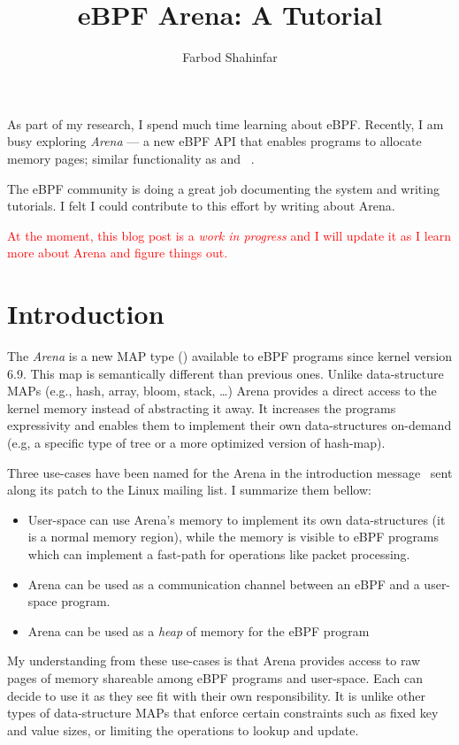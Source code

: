 \documentclass{article}
\title{eBPF Arena: A Tutorial}
\author{Farbod Shahinfar}
\begin{document}
\maketitle



As part of my research, I spend much time learning about eBPF.
Recently, I am busy exploring \emph{Arena} --- a new eBPF API that enables
programs to allocate memory pages; similar functionality as  and
~\cite{arenapatch}.

The eBPF community is doing a great job documenting the system and writing
tutorials. I felt I could contribute to this effort by writing about Arena.

{
    \textcolor{red}{At the moment, this blog post is a \emph{work in
    progress} and I will update it as I learn more about Arena and figure
    things out.}
}

\section{Introduction}

The \emph{Arena} is a new MAP type () available to eBPF programs
since kernel version 6.9.
This map is semantically different than previous ones.
Unlike data-structure MAPs (e.g., hash, array, bloom, stack, \dots{}) Arena
provides a direct access to the kernel memory instead of abstracting it away.
It increases the programs expressivity and enables them to implement their own
data-structures on-demand (e.g, a specific type of tree or a more optimized
version of hash-map).

Three use-cases have been named for the Arena in the introduction
message~\cite{arenapatch} sent along its patch to the Linux mailing list. I
summarize them bellow:
\begin{itemize}
    \item User-space can use Arena's memory to implement its own
        data-structures (it is a normal memory region), while the memory is
        visible to eBPF programs which can implement a fast-path for operations
        like packet processing.
    \item Arena can be used as a communication channel between an eBPF and a
        user-space program.
    \item Arena can be used as a \emph{heap} of memory for the eBPF program
\end{itemize}
My understanding from these use-cases is that Arena provides access to raw
pages of memory shareable among eBPF programs and user-space. Each can decide
to use it as they see fit with their own responsibility. It is unlike other
types of data-structure MAPs that enforce certain constraints such as fixed key
and value sizes, or limiting the operations to lookup and update.
\end{document}
